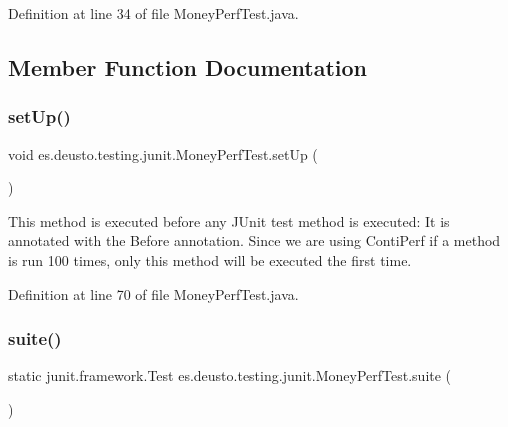 Definition at line 34 of file Money\+Perf\+Test.\+java.



\subsection{Member Function Documentation}
\mbox{\label{classes_1_1deusto_1_1testing_1_1junit_1_1_money_perf_test_aa24e252a73c82c35d9b623ea276fe29e}} 
\subsubsection{\texorpdfstring{setUp()}{setUp()}}
{\footnotesize\ttfamily void es.\+deusto.\+testing.\+junit.\+Money\+Perf\+Test.\+set\+Up (\begin{DoxyParamCaption}{ }\end{DoxyParamCaption})}

This method is executed before any J\+Unit test method is executed\+: It is annotated with the Before annotation. Since we are using Conti\+Perf if a method is run 100 times, only this method will be executed the first time. 

Definition at line 70 of file Money\+Perf\+Test.\+java.

\mbox{\label{classes_1_1deusto_1_1testing_1_1junit_1_1_money_perf_test_a055d5d73134dccc41be33a91dc75e529}} 
\subsubsection{\texorpdfstring{suite()}{suite()}}
{\footnotesize\ttfamily static junit.\+framework.\+Test es.\+deusto.\+testing.\+junit.\+Money\+Perf\+Test.\+suite (\begin{DoxyParamCaption}{ }\end{DoxyParamCaption})\hspace{0.3cm}{\ttfamily [static]}}



